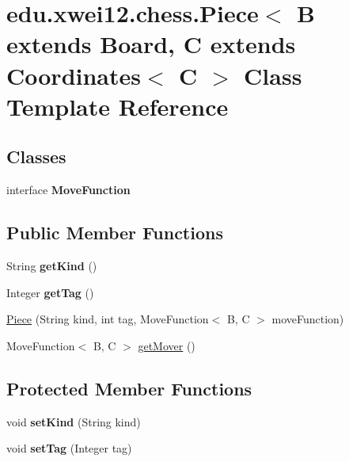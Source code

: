 \hypertarget{classedu_1_1xwei12_1_1chess_1_1_piece}{}\section{edu.\+xwei12.\+chess.\+Piece$<$ B extends Board, C extends Coordinates$<$ C $>$ Class Template Reference}
\label{classedu_1_1xwei12_1_1chess_1_1_piece}
\subsection*{Classes}
\begin{DoxyCompactItemize}
\item 
interface {\bfseries Move\+Function}
\end{DoxyCompactItemize}
\subsection*{Public Member Functions}
\begin{DoxyCompactItemize}
\item 
String {\bfseries get\+Kind} ()\hypertarget{classedu_1_1xwei12_1_1chess_1_1_piece_a73b4aab85a136f4332ad2c5d8b381b85}{}\label{classedu_1_1xwei12_1_1chess_1_1_piece_a73b4aab85a136f4332ad2c5d8b381b85}

\item 
Integer {\bfseries get\+Tag} ()\hypertarget{classedu_1_1xwei12_1_1chess_1_1_piece_a4c66d1925435562706da902f6fd2e652}{}\label{classedu_1_1xwei12_1_1chess_1_1_piece_a4c66d1925435562706da902f6fd2e652}

\item 
\hyperlink{classedu_1_1xwei12_1_1chess_1_1_piece_acfd785e3c3cf8f00f1d0d7430b9e6f8b}{Piece} (String kind, int tag, Move\+Function$<$ B, C $>$ move\+Function)
\item 
Move\+Function$<$ B, C $>$ \hyperlink{classedu_1_1xwei12_1_1chess_1_1_piece_a12e3de9acb24ca9ff5e1f24c9e795075}{get\+Mover} ()
\end{DoxyCompactItemize}
\subsection*{Protected Member Functions}
\begin{DoxyCompactItemize}
\item 
void {\bfseries set\+Kind} (String kind)\hypertarget{classedu_1_1xwei12_1_1chess_1_1_piece_a1a1cd7f8732a010a052b4050b6d2b43f}{}\label{classedu_1_1xwei12_1_1chess_1_1_piece_a1a1cd7f8732a010a052b4050b6d2b43f}

\item 
void {\bfseries set\+Tag} (Integer tag)\hypertarget{classedu_1_1xwei12_1_1chess_1_1_piece_aecf345e53645feb46095e9199f056b09}{}\label{classedu_1_1xwei12_1_1chess_1_1_piece_aecf345e53645feb46095e9199f056b09}

\end{DoxyCompactItemize}


